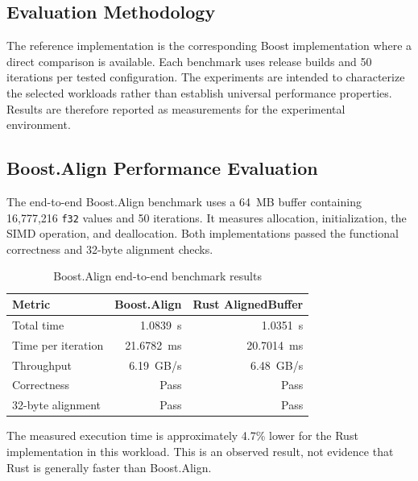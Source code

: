 \subsection{Evaluation Methodology}
\label{sec:evaluation_methodology}

The reference implementation is the corresponding Boost implementation where a direct comparison is available. Each benchmark uses release builds and 50 iterations per tested configuration. The experiments are intended to characterize the selected workloads rather than establish universal performance properties. Results are therefore reported as measurements for the experimental environment.

\subsection{Boost.Align Performance Evaluation}
\label{sec:align_performance_evaluation}

The end-to-end Boost.Align benchmark uses a 64~MB buffer containing 16,777,216 \texttt{f32} values and 50 iterations. It measures allocation, initialization, the SIMD operation, and deallocation. Both implementations passed the functional correctness and 32-byte alignment checks.

\begin{table}[H]
\centering
\renewcommand{\arraystretch}{1.2}
\begin{tabular}{|l|r|r|}
\hline
\textbf{Metric} & \textbf{Boost.Align} & \textbf{Rust AlignedBuffer} \\ \hline
Total time & 1.0839~s & 1.0351~s \\ \hline
Time per iteration & 21.6782~ms & 20.7014~ms \\ \hline
Throughput & 6.19~GB/s & 6.48~GB/s \\ \hline
Correctness & Pass & Pass \\ \hline
32-byte alignment & Pass & Pass \\ \hline
\end{tabular}
\caption{Boost.Align end-to-end benchmark results}
\label{tab:align_end_to_end_results}
\end{table}

The measured execution time is approximately 4.7\% lower for the Rust implementation in this workload. This is an observed result, not evidence that Rust is generally faster than Boost.Align.


